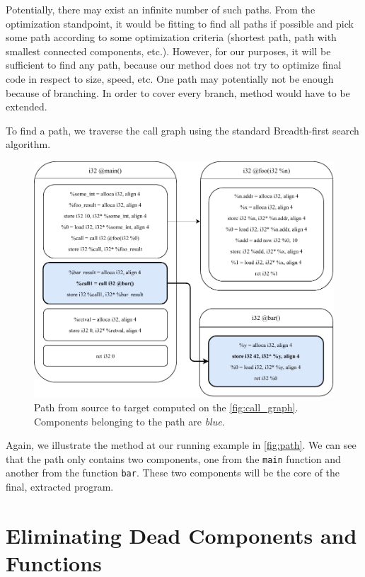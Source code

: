 \documentclass[12pt, twoside]{fithesis2}
\renewcommand{\_}{\leavevmode \kern0.07em\vbox{\hrule width0.4em}}
\begin{document}
Potentially, there may exist an infinite number of such paths.
From the optimization standpoint, it would be fitting to find all paths if
possible and pick some path according to some optimization criteria (shortest
path, path with smallest connected components, etc.).
However, for our purposes, it will be sufficient to find any path, because
our method does not try to optimize final code in respect to size, speed, etc.
One path may potentially not be enough because of branching. In order to cover
every branch, method would have to be extended.

To find a path, we traverse the call graph using the standard Breadth-first
search algorithm.

\begin{figure}[ht]
    \centering
    \includegraphics[]{images/main_path.pdf}
    \caption{Path from source to target computed on the
    \autoref{fig:call_graph}. Components belonging to the path are \emph{blue}.
    }
    \label{fig:path}
\end{figure}

Again, we illustrate the method at our running example in \autoref{fig:path}.
We can see that the path only contains two components, one from the
\texttt{main} function and another from the function
\texttt{bar}.
These two components will be the core of the final, extracted program.

\section{Eliminating Dead Components and Functions}
\label{sec:design-removing}
\end{document}

